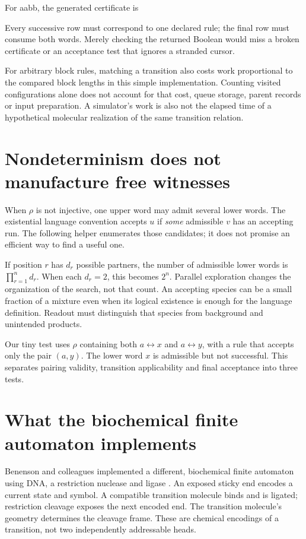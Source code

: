 For aabb, the generated certificate is
\begin{center}\end{center}
Every successive row must correspond to one declared rule; the final row must
consume both words. Merely checking the returned Boolean would miss a broken
certificate or an acceptance test that ignores a stranded cursor.

For arbitrary block rules, matching a transition also costs work proportional
to the compared block lengths in this simple implementation. Counting visited
configurations alone does not account for that cost, queue storage, parent
records or input preparation. A simulator's work is also not the elapsed time
of a hypothetical molecular realization of the same transition relation.

\section{Nondeterminism does not manufacture free witnesses}
When $\rho$ is not injective, one upper word may admit several lower words.
The existential language convention accepts $u$ if \emph{some} admissible
$v$ has an accepting run. The following helper enumerates those candidates;
it does not promise an efficient way to find a useful one.


If position $r$ has $d_r$ possible partners, the number of admissible lower
words is $\prod_{r=1}^{n}d_r$. When each $d_r=2$, this becomes $2^n$.
Parallel exploration changes the organization of the search, not that count.
An accepting species can be a small fraction of a mixture even when its
logical existence is enough for the language definition. Readout must
distinguish that species from background and unintended products.

Our tiny test uses $\rho$ containing both $a\leftrightarrow x$ and
$a\leftrightarrow y$, with a rule that accepts only the pair $(a,y)$.
The lower word $x$ is admissible but not successful. This separates pairing
validity, transition applicability and final acceptance into three tests.

\section{What the biochemical finite automaton implements}
Benenson and colleagues implemented a different, biochemical finite automaton
using DNA, a restriction nuclease and ligase \cite{Benenson2001}. An exposed sticky
end encodes a current state and symbol. A compatible transition molecule binds
and is ligated; restriction cleavage exposes the next encoded end. The
transition molecule's geometry determines the cleavage frame. These are
chemical encodings of a transition, not two independently addressable heads.

